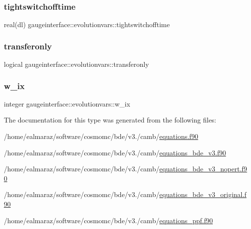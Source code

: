 \mbox{\label{structgaugeinterface_1_1evolutionvars_ab871119ea049c6a5daa1d3ebbe7b2bfc}} 
\subsubsection{\texorpdfstring{tightswitchofftime}{tightswitchofftime}}
{\footnotesize\ttfamily real(dl) gaugeinterface\+::evolutionvars\+::tightswitchofftime}

\mbox{\label{structgaugeinterface_1_1evolutionvars_a0221c6b5ef19af720fbbc738c2441dc7}} 
\subsubsection{\texorpdfstring{transferonly}{transferonly}}
{\footnotesize\ttfamily logical gaugeinterface\+::evolutionvars\+::transferonly}

\mbox{\label{structgaugeinterface_1_1evolutionvars_afb5b2fa1570ab87abbf977febcb66d6b}} 
\subsubsection{\texorpdfstring{w\+\_\+ix}{w\_ix}}
{\footnotesize\ttfamily integer gaugeinterface\+::evolutionvars\+::w\+\_\+ix}



The documentation for this type was generated from the following files\+:\begin{DoxyCompactItemize}
\item 
/home/ealmaraz/software/cosmomc/bde/v3./camb/\mbox{\hyperlink{equations_8f90}{equations.\+f90}}\item 
/home/ealmaraz/software/cosmomc/bde/v3./camb/\mbox{\hyperlink{equations__bde__v3_8f90}{equations\+\_\+bde\+\_\+v3.\+f90}}\item 
/home/ealmaraz/software/cosmomc/bde/v3./camb/\mbox{\hyperlink{equations__bde__v3__nopert_8f90}{equations\+\_\+bde\+\_\+v3\+\_\+nopert.\+f90}}\item 
/home/ealmaraz/software/cosmomc/bde/v3./camb/\mbox{\hyperlink{equations__bde__v3__original_8f90}{equations\+\_\+bde\+\_\+v3\+\_\+original.\+f90}}\item 
/home/ealmaraz/software/cosmomc/bde/v3./camb/\mbox{\hyperlink{equations__ppf_8f90}{equations\+\_\+ppf.\+f90}}\end{DoxyCompactItemize}
